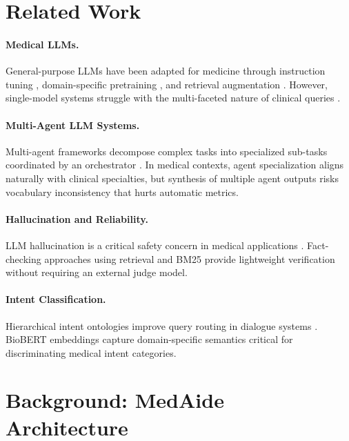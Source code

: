\documentclass[conference]{IEEEtran}
\begin{document}
\section{Related Work}
\label{sec:related}

\paragraph{Medical LLMs.}
General-purpose LLMs have been adapted for medicine through instruction tuning
\cite{zhang2023huatuogpt}, domain-specific pretraining \cite{singhal2023meditron},
and retrieval augmentation \cite{es2023ragas}. However, single-model systems struggle
with the multi-faceted nature of clinical queries \cite{mediaide2024}.

\paragraph{Multi-Agent LLM Systems.}
Multi-agent frameworks decompose complex tasks into specialized sub-tasks coordinated
by an orchestrator \cite{yao2023react,shinn2023reflexion}. In medical contexts, agent
specialization aligns naturally with clinical specialties, but synthesis of multiple
agent outputs risks vocabulary inconsistency that hurts automatic metrics.

\paragraph{Hallucination and Reliability.}
LLM hallucination is a critical safety concern in medical applications \cite{guo2025deepseek}.
Fact-checking approaches using retrieval \cite{izacard2021fid} and BM25 \cite{robertson2009bm25}
provide lightweight verification without requiring an external judge model.

\paragraph{Intent Classification.}
Hierarchical intent ontologies improve query routing in dialogue systems \cite{velickovic2018gat}.
BioBERT embeddings \cite{lee2020biobert} capture domain-specific semantics critical for
discriminating medical intent categories.

\section{Background: MedAide Architecture}
\label{sec:background}
\end{document}
